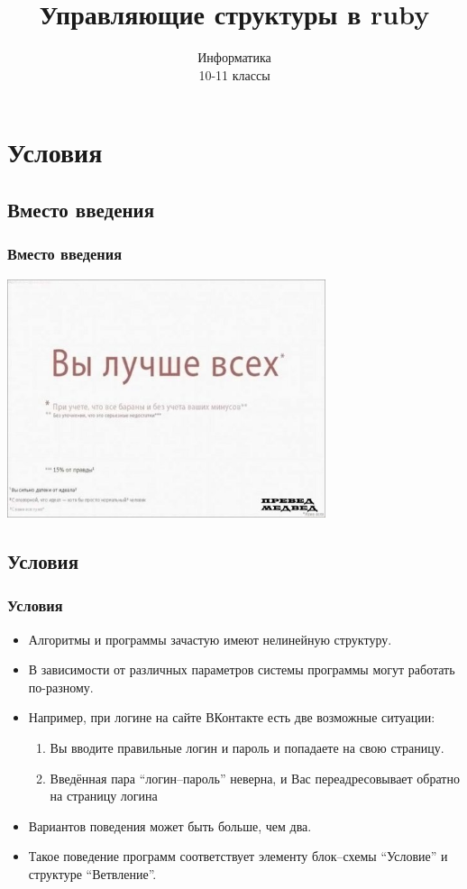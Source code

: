 \documentclass[compress,red]{beamer}
\title{Управляющие структуры в ruby}
\author{Информатика \\ 10-11 классы}
\begin{document}
\maketitle

\section{Условия}

\subsection{Вместо введения}
\begin{frame}
  \frametitle{Вместо введения}
	\centerline{\includegraphics[width=0.7\textwidth]{images/you_are_the_best.jpg}}
\end{frame}

\subsection{Условия}
\begin{frame}
\frametitle{Условия}
		\begin{itemize}
		\item Алгоритмы и программы зачастую имеют нелинейную структуру.
		\item В зависимости от различных параметров системы программы могут работать по-разному.
		\item Например, при логине на сайте ВКонтакте есть две возможные ситуации:
		  \begin{enumerate}
		    \item Вы вводите правильные логин и пароль и попадаете на свою страницу.
		    \item Введённая пара ``логин--пароль'' неверна, и Вас переадресовывает обратно на страницу логина
	    \end{enumerate}
	  \item Вариантов поведения может быть больше, чем два.
	  \item Такое поведение программ соответствует элементу блок--схемы ``Условие'' и структуре ``Ветвление''.
		\end{itemize}
\end{frame}
\end{document}
